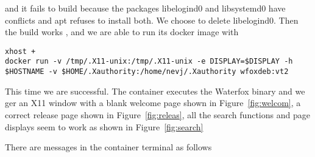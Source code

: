 \documentclass{article}  %
\begin{document}
and it fails to build because the packages libelogind0 and libsystemd0 have conflicts and apt refuses to install both. We choose to delete libelogind0. 
Then the build works , and we are able to run its docker image with
\begin{verbatim}
xhost +
docker run -v /tmp/.X11-unix:/tmp/.X11-unix -e DISPLAY=$DISPLAY -h $HOSTNAME -v $HOME/.Xauthority:/home/nevj/.Xauthority wfoxdeb:vt2
\end{verbatim}
This time we are successful. The container executes the Waterfox binary and we ger an X11 window with a blank welcome page shown in Figure~\ref{fig:welcom}, a correct release page shown in Figure~\ref{fig:releas}, all the search functions and page displays seem to work as shown in Figure~\ref{fig:search}



There are messages in the container terminal as follows
\end{document}
